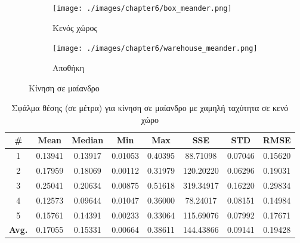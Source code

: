\begin{figure}[!ht]
        \begin{subfigure}{0.5\textwidth}
            \texttt{[image: ./images/chapter6/box\_meander.png]}
                \caption{Κενός χώρος}
             \label{fig:box_meander}
        \end{subfigure}
        \begin{subfigure}{0.5\textwidth}
            \texttt{[image: ./images/chapter6/warehouse\_meander.png]}
            \caption{Αποθήκη}
            \label{fig:warehouse_meander}
        \end{subfigure}
        \caption{Κίνηση σε μαίανδρο}
        \label{fig:meander}
\end{figure}


\begin{table}[H]
    \centering
    \caption{Σφάλμα θέσης (σε μέτρα) για κίνηση σε μαίανδρο με χαμηλή ταχύτητα σε κενό χώρο}
    \label{tab:position_error_meander_slow_box}
    \begin{tabular}{| c | c | c | c | c | c | c | c | }
        \hline
        \rowcolor{Gray}
        \# & Mean & Median & Min & Max & SSE & STD & RMSE \\
        \hline
        1 & 0.13941 & 0.13917 & 0.01053 & 0.40395 & 88.71098 & 0.07046 & 0.15620 \\
        2 & 0.17959 & 0.18069 & 0.00112 & 0.31979 & 120.20220 & 0.06296 & 0.19031 \\
        3 & 0.25041 & 0.20634 & 0.00875 & 0.51618 & 319.34917 & 0.16220 & 0.29834 \\
        4 & 0.12573 & 0.09644 & 0.01047 & 0.36000 & 78.24017 & 0.08151 & 0.14984 \\
        5 & 0.15761 & 0.14391 & 0.00233 & 0.33064 & 115.69076 & 0.07992 & 0.17671 \\
        \hline
        \textbf{Avg.} & 0.17055 & 0.15331 & 0.00664 & 0.38611 & 144.43866 & 0.09141 & 0.19428 \\
        \hline
    \end{tabular}
\end{table}


